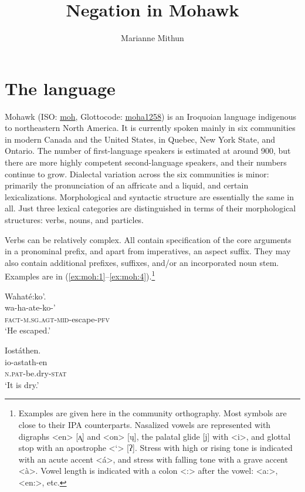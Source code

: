\documentclass[output=paper,colorlinks,citecolor=brown]{langscibook}
\author{Marianne Mithun\affiliation{}}
\title{Negation in Mohawk}
\begin{document}
\maketitle 

\section{The language} 

Mohawk (ISO: \href{https://iso639-3.sil.org/code/moh}{moh}, Glottocode: \href{https://glottolog.org/resource/languoid/id/moha1258}{moha1258}) is an Iroquoian language indigenous to northeastern North America. It is currently spoken mainly in six communities in modern Canada and the United States, in  Quebec, New York State, and Ontario. The number of first-language speakers is estimated at around 900, but there are more highly competent second-language speakers, and their numbers continue to grow. Dialectal variation across the six communities is minor: primarily the pronunciation of an affricate and a liquid, and certain lexicalizations. Morphological and syntactic structure are essentially the same in all. Just three lexical categories are distinguished in terms of their morphological structures: verbs, nouns, and particles.

Verbs can be relatively complex. All contain specification of the core arguments in a pronominal prefix, and apart from imperatives, an aspect suffix. They may also contain additional prefixes, suffixes, and/or an incorporated noun stem. Examples are in (\ref{ex:moh:1}--\ref{ex:moh:4}).\footnote{Examples are given here in the community orthography. Most symbols are close to their IPA counterparts. Nasalized vowels are represented with digraphs <en> [ʌ̨] and <on> [ų], the palatal glide [j] with <i>, and glottal stop with an apostrophe <‘> [ʔ]. Stress with high or rising tone is indicated with an acute accent <á>, and stress with falling tone with a grave accent <à>. Vowel length is indicated with a colon <:> after the vowel: <a:>, <en:>, etc.}

\ea\label{ex:moh:1}
    \glll Wahaté:ko’. \\ 
         wa-ha-ate-ko-’ \\
         \textsc{fact-m.sg.agt-mid-}escape-\textsc{pfv} \\
    \glt ‘He escaped.’
\z 

\ea\label{ex:moh:2}
    \glll Iostáthen. \\ 
         io-astath-en \\
         \textsc{n.pat}-be.dry-\textsc{stat} \\
    \glt ‘It is dry.’
\z 
\end{document}

